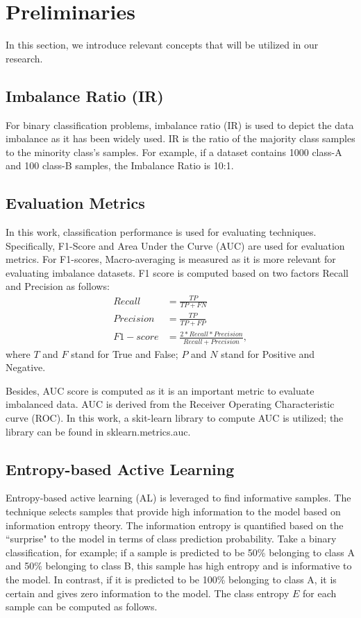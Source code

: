 \documentclass[journal]{IEEEtai}
\begin{document}



\section{Preliminaries}
\label{sec:preliminaries}       
In this section, we introduce relevant concepts that will be utilized in our research.

\subsection{Imbalance Ratio (IR)}
For binary classification problems, imbalance ratio (IR) is used to depict the data imbalance as it has been widely used. IR is the ratio of the majority class samples to the minority class's samples. For example, if a dataset contains 1000 class-A and 100 class-B samples, the Imbalance Ratio is 10:1.   

\subsection{Evaluation Metrics}
\label{f1score}
In this work, classification performance is used for evaluating techniques. Specifically, F1-Score and Area Under the Curve (AUC) are used for evaluation metrics. For F1-scores, Macro-averaging is measured as it is more relevant for evaluating imbalance datasets.
F1 score is computed based on two factors Recall and Precision as follows:\\
\begin{align}
	Recall &= \frac{TP}{TP+FN}\\
	Precision &= \frac{TP}{TP+FP}\\
	F1-score &= \frac{2*Recall*Precision}{Recall+Precision},
\end{align}
where $T$ and $F$ stand for True and False; $P$ and $N$ stand for Positive and Negative. 

Besides, AUC \cite{cite:AUC} score is computed as it is an important metric to evaluate imbalanced data. AUC is derived from the Receiver Operating Characteristic curve (ROC). In this work, a skit-learn library to compute AUC is utilized; the library can be found in sklearn.metrics.auc. 

\subsection{Entropy-based Active Learning }   
\label{sec:EAL}
Entropy-based active learning (AL) \cite{shannon_mathematical_1948} is leveraged to find informative samples. The technique selects samples that provide high information to the model based on information entropy theory. The information entropy is quantified based on the ``surprise" to the model in terms of class prediction probability. Take a binary classification, for example; if a sample is predicted to be 50\% belonging to class A and 50\% belonging to class B, this sample has high entropy and is informative to the model. In contrast, if it is predicted to be 100\% belonging to class A, it is certain and gives zero information to the model. The class entropy $E$ for each sample can be computed as follows. 
\end{document}
